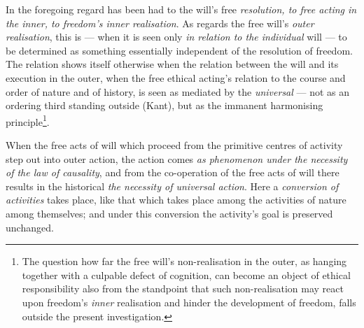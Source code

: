 \documentclass[12pt,a4paper]{book}
\begin{document}
In the foregoing regard has been had to the will's free \emph{resolution, to
free acting in the inner, to freedom's inner realisation}. As regards the free
will's \emph{outer realisation}, this is --- when it is seen only \emph{in
relation to the individual} will --- to be determined as something essentially
independent of the resolution of freedom. The relation shows itself otherwise
when the relation between the will and its execution in the outer, when the
free ethical acting's relation to the course and order of nature and of
history, is seen as mediated by the \emph{universal} --- not as an ordering
third standing outside (Kant), but as the immanent harmonising
principle\footnote{The question how far the free will's non-realisation in the
outer, as hanging together with a culpable defect of cognition, can become an
object of ethical responsibility also from the standpoint that such
non-realisation may react upon freedom's \emph{inner} realisation and hinder
the development of freedom, falls outside the present investigation.}.

When the free acts of will which proceed from the primitive centres of activity
step out into outer action, the action comes \emph{as phenomenon under the
necessity of the law of causality}, and from the co-operation of the free acts
of will there results in the historical \emph{the necessity of universal
action}. Here a \emph{conversion of activities} takes place, like that which
takes place among the activities of nature among themselves; and under this
conversion the activity's goal is preserved unchanged.
\end{document}
